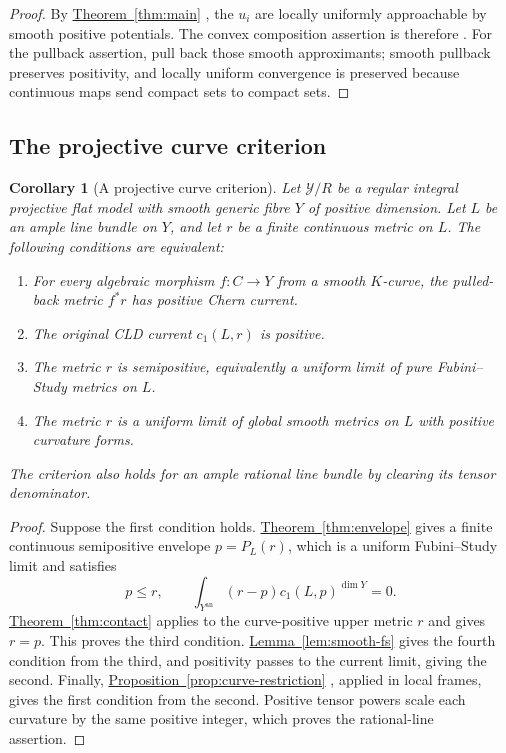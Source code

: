 \documentclass[11pt]{amsart}
\newtheorem{corollary}[theorem]{Corollary}
\theoremstyle{definition}
\theoremstyle{remark}
\numberwithin{equation}{section}
\newcommand{\an}{\mathrm{an}}
\newcommand{\namedref}[2]{%
 \begingroup
 \ifstrequal{#1}{Section}{\hypersetup{linkcolor=sectionteal}}{%
  \ifstrequal{#1}{Appendix}{\hypersetup{linkcolor=sectionteal}}{}}%
 \hyperref[#2]{#1~\ref*{#2}}%
 \endgroup}
\begin{document}
\begin{proof}
By \namedref{Theorem}{thm:main}, the \(u_i\) are locally uniformly
approachable by smooth positive potentials. The convex composition
assertion is therefore \cite[Corollary 8.2.4]{CLD25}.
For the pullback assertion, pull back those smooth approximants;
smooth pullback preserves positivity, and locally uniform convergence
is preserved because continuous maps send compact sets to compact sets.
\end{proof}

\subsection{The projective curve criterion}
\begin{corollary}[A projective curve criterion]
\label{cor:projective-criterion}
Let \(\mathscr Y/R\) be a regular integral projective flat model with
smooth generic fibre \(Y\) of positive dimension. Let \(L\) be an
ample line bundle on \(Y\), and let \(r\) be a finite continuous
metric on \(L\). The following conditions are equivalent:
\begin{enumerate}
\item For every algebraic morphism \(f:C\to Y\) from a smooth
\(K\)-curve, the pulled-back metric \(f^*r\) has positive Chern current.
\item The original CLD current \(c_1(L,r)\) is positive.
\item The metric \(r\) is semipositive, equivalently a uniform limit
of pure Fubini--Study metrics on \(L\).
\item The metric \(r\) is a uniform limit of global smooth metrics on
\(L\) with positive curvature forms.
\end{enumerate}
The criterion also holds for an ample rational line bundle by clearing
its tensor denominator.
\end{corollary}

\begin{proof}
Suppose the first condition holds. \namedref{Theorem}{thm:envelope} gives a
finite continuous semipositive envelope \(p=P_L(r)\), which is a
uniform Fubini--Study limit and satisfies
\[
 p\leq r,\qquad
 \int_{Y^\an}(r-p)c_1(L,p)^{\dim Y}=0.
\]
\namedref{Theorem}{thm:contact} applies to the curve-positive upper metric
\(r\) and gives \(r=p\). This proves the third condition.
\namedref{Lemma}{lem:smooth-fs} gives the fourth condition from the third,
and positivity passes to the current limit, giving the second.
Finally, \namedref{Proposition}{prop:curve-restriction}, applied in local
frames, gives the first condition from the second. Positive tensor
powers scale each curvature by the same positive integer, which proves
the rational-line assertion.
\end{proof}
\end{document}
